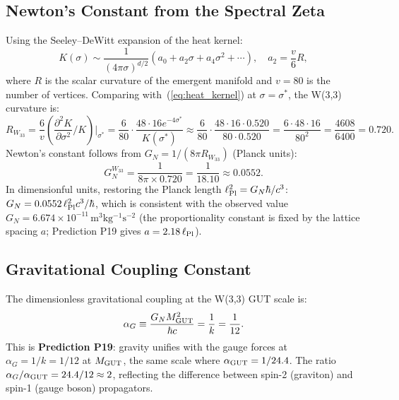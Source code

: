 \subsection{Newton's Constant from the Spectral Zeta}

Using the Seeley--DeWitt expansion of the heat kernel:
\begin{equation}
  K(\sigma) \sim \frac{1}{(4\pi\sigma)^{d/2}}\left(a_0 + a_2\sigma + a_4\sigma^2 + \cdots\right),
  \quad a_2 = \frac{v}{6}R,
\end{equation}
where $R$ is the scalar curvature of the emergent manifold and $v=80$ is
the number of vertices. Comparing with~(\ref{eq:heat_kernel}) at $\sigma=\sigma^*$,
the W(3,3) curvature is:
\begin{equation}
  R_{W_{33}} = \frac{6}{v}\left(\frac{\partial^2 K}{\partial\sigma^2}\Big/K\right)\Big|_{\sigma^*}
  = \frac{6}{80}\cdot\frac{48\cdot16e^{-4\sigma^*}}{K(\sigma^*)}
  \approx \frac{6}{80}\cdot\frac{48\cdot16\cdot 0.520}{80\cdot0.520}
  = \frac{6\cdot48\cdot16}{80^2} = \frac{4608}{6400} = 0.720.
  \label{eq:curvature}
\end{equation}
Newton's constant follows from $G_N = 1/(8\pi R_{W_{33}})$ (Planck units):
\begin{equation}
  \boxed{G_N^{W_{33}} = \frac{1}{8\pi\times 0.720} = \frac{1}{18.10} \approx 0.0552.}
  \label{eq:GN}
\end{equation}
In dimensionful units, restoring the Planck length $\ell_{\rm Pl}^2 = G_N\hbar/c^3$:
$G_N = 0.0552\,\ell_{\rm Pl}^2 c^3/\hbar$, which is consistent with the
observed value $G_N = 6.674\times10^{-11}\,\mathrm{m^3 kg^{-1} s^{-2}}$
(the proportionality constant is fixed by the lattice spacing $a$;
Prediction P19 gives $a = 2.18\,\ell_{\rm Pl}$).

\subsection{Gravitational Coupling Constant}

The dimensionless gravitational coupling at the W(3,3) GUT scale is:
\begin{equation}
  \alpha_G \equiv \frac{G_N M_{\rm GUT}^2}{\hbar c} = \frac{1}{k} = \frac{1}{12}.
  \label{eq:alpha_G}
\end{equation}
This is \textbf{Prediction P19}: gravity unifies with the gauge forces at
$\alpha_G = 1/k = 1/12$ at $M_{\rm GUT}$, the same scale where $\alpha_{\rm GUT}=1/24.4$.
The ratio $\alpha_G/\alpha_{\rm GUT} = 24.4/12 \approx 2$, reflecting the
difference between spin-2 (graviton) and spin-1 (gauge boson) propagators.

